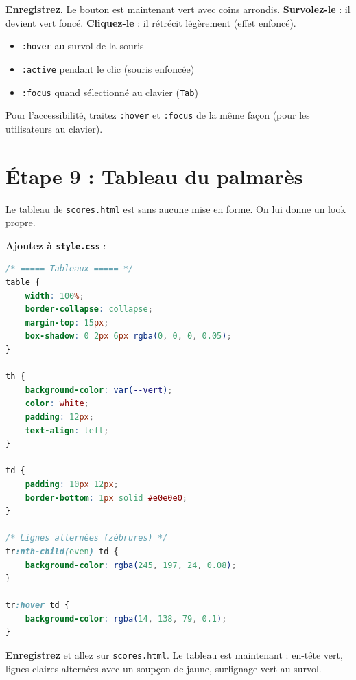 \documentclass[11pt,a4paper]{article}
\newcommand{\cmark}{\ding{51}}
\begin{document}
\textbf{Enregistrez}. Le bouton est maintenant vert avec coins arrondis.
\textbf{Survolez-le} : il devient vert foncé. \textbf{Cliquez-le} : il
rétrécit légèrement (effet \og{}enfoncé\fg{}). \cmark

\begin{retenirbox}
\begin{itemize}[nosep]
    \item \texttt{:hover} \quad au survol de la souris
    \item \texttt{:active} \quad pendant le clic (souris enfoncée)
    \item \texttt{:focus} \quad quand sélectionné au clavier (\texttt{Tab})
\end{itemize}
Pour l'accessibilité, traitez \texttt{:hover} et \texttt{:focus} de la
même façon (pour les utilisateurs au clavier).
\end{retenirbox}

\newpage

\section{Étape 9 : Tableau du palmarès}

Le tableau de \texttt{scores.html} est sans aucune mise en forme. On lui
donne un look propre.

\textbf{Ajoutez à \texttt{style.css}} :

\begin{lstlisting}[language=CSS]
/* ===== Tableaux ===== */
table {
    width: 100%;
    border-collapse: collapse;
    margin-top: 15px;
    box-shadow: 0 2px 6px rgba(0, 0, 0, 0.05);
}

th {
    background-color: var(--vert);
    color: white;
    padding: 12px;
    text-align: left;
}

td {
    padding: 10px 12px;
    border-bottom: 1px solid #e0e0e0;
}

/* Lignes alternées (zébrures) */
tr:nth-child(even) td {
    background-color: rgba(245, 197, 24, 0.08);
}

tr:hover td {
    background-color: rgba(14, 138, 79, 0.1);
}
\end{lstlisting}

\textbf{Enregistrez} et allez sur \texttt{scores.html}. Le tableau est
maintenant : en-tête vert, lignes claires alternées avec un soupçon de
jaune, surlignage vert au survol. \cmark
\end{document}
